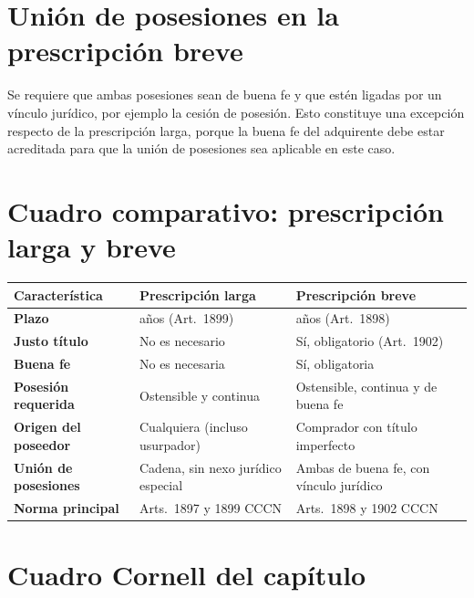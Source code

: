 \documentclass[12pt,oneside]{book}
\begin{document}
\section{Unión de posesiones en la prescripción breve}

Se requiere que ambas posesiones sean de buena fe y que estén ligadas por un vínculo jurídico, por ejemplo la cesión de posesión. Esto constituye una excepción respecto de la prescripción larga, porque la buena fe del adquirente debe estar acreditada para que la unión de posesiones sea aplicable en este caso.

\section{Cuadro comparativo: prescripción larga y breve}

\begin{center}
\begin{tabularx}{\textwidth}{@{}>{\raggedright\arraybackslash}p{} >{\raggedright\arraybackslash}X >{\raggedright\arraybackslash}X@{}}
\toprule
\textbf{Característica} & \textbf{Prescripción larga} & \textbf{Prescripción breve} \\
\midrule
\textbf{Plazo} & 20 años (Art.~1899) & 10 años (Art.~1898) \\
\textbf{Justo título} & No es necesario & Sí, obligatorio (Art.~1902) \\
\textbf{Buena fe} & No es necesaria & Sí, obligatoria \\
\textbf{Posesión requerida} & Ostensible y continua & Ostensible, continua y de buena fe \\
\textbf{Origen del poseedor} & Cualquiera (incluso usurpador) & Comprador con título imperfecto \\
\textbf{Unión de posesiones} & Cadena, sin nexo jurídico especial & Ambas de buena fe, con vínculo jurídico \\
\textbf{Norma principal} & Arts.~1897 y 1899 CCCN & Arts.~1898 y 1902 CCCN \\
\bottomrule
\end{tabularx}
\end{center}

\section{Cuadro Cornell del capítulo}
\end{document}
